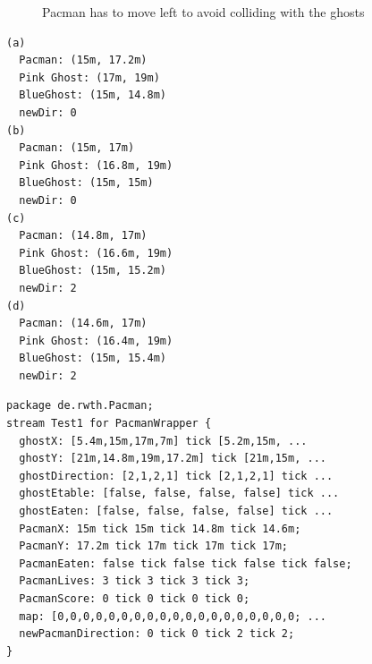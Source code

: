 \begin{figure}[!h]
	\caption{Pacman has to move left to avoid colliding with the ghosts} 
	\label{fig:PacmanFleeing}
\end{figure}

\begin{lstlisting}[caption={Values for the stream test},label=lst:pmStreamValues, frame=single, float,floatplacement=H]
(a)
  Pacman: (15m, 17.2m) 
  Pink Ghost: (17m, 19m) 
  BlueGhost: (15m, 14.8m) 
  newDir: 0
(b)	
  Pacman: (15m, 17m) 
  Pink Ghost: (16.8m, 19m) 
  BlueGhost: (15m, 15m) 
  newDir: 0
(c)	
  Pacman: (14.8m, 17m) 
  Pink Ghost: (16.6m, 19m) 
  BlueGhost: (15m, 15.2m) 
  newDir: 2
(d)	
  Pacman: (14.6m, 17m) 
  Pink Ghost: (16.4m, 19m)
  BlueGhost: (15m, 15.4m)
  newDir: 2
\end{lstlisting}

\begin{lstlisting}[caption={Stream test for the scenario above},label=lst:pmStreamTest, frame=single, morekeywords={tick, stream, for, package}, float,floatplacement=H]
package de.rwth.Pacman;
stream Test1 for PacmanWrapper {
  ghostX: [5.4m,15m,17m,7m] tick [5.2m,15m, ...
  ghostY: [21m,14.8m,19m,17.2m] tick [21m,15m, ...
  ghostDirection: [2,1,2,1] tick [2,1,2,1] tick ...
  ghostEtable: [false, false, false, false] tick ...
  ghostEaten: [false, false, false, false] tick ...
  PacmanX: 15m tick 15m tick 14.8m tick 14.6m;
  PacmanY: 17.2m tick 17m tick 17m tick 17m;
  PacmanEaten: false tick false tick false tick false;
  PacmanLives: 3 tick 3 tick 3 tick 3;
  PacmanScore: 0 tick 0 tick 0 tick 0;
  map: [0,0,0,0,0,0,0,0,0,0,0,0,0,0,0,0,0,0,0; ...
  newPacmanDirection: 0 tick 0 tick 2 tick 2;
}
\end{lstlisting}

